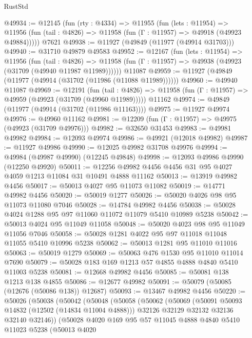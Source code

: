 \begin{lexlean}{RustStd}
\begin{coremodule}
@49934 := @12145
    (fun (rty : @4334) =>
    @11955
      (fun (lets : @11954) =>
      @11956 (fun (tail : @4826) => @11958 (fun (Γ : @11957) => @49918 (@49923 @49884)))))
    @7621
@49938 := @11927 (@49849 (@11977 (@49914 @31703)))
@49940 := @31710 @49879 @49583
@49952 := @12167
    (fun (lets : @11954) =>
    @11956
      (fun (tail : @4826) =>
      @11958 (fun (Γ : @11957) => @49938 (@49923 (@31709 (@49940 @11987 @11989))))))
    @11087
@49959 := @11927 (@49849 (@11977 (@49914 (@31702 (@11986 (@11088 @11989))))))
@49960 := @49940 @11087
@49969 := @12191
    (fun (tail : @4826) => @11958 (fun (Γ : @11957) => @49959 (@49923 (@31709 (@49960 @11989)))))
    @11162
@49974 := @49849 (@11977 (@49914 (@31702 (@11986 @11163))))
@49975 := @11927 @49974
@49976 := @49960 @11162
@49981 := @12209 (fun (Γ : @11957) => @49975 (@49923 (@31709 @49976)))
@49982 := @32650 @31453
@49983 := @49981 @49982
@49984 := @12093 @49974
@49986 := @49921 (@12018 @49982)
@49987 := @11927 @49986
@49990 := @12025 @49982 @31708 @49976
@49994 := @49984 (@49987 @49990) (@12245 @49848)
@49998 := @12093 @49986 @49990 (@12250 @49920)
@50011 := @12256 @49982 @4456 @4456 @31 @95 @4027 @4059 @1213 @11084 @31 @10491 @4888 @11162
@50013 := @13919 @49982 @4456
@50017 := @50013 @4027 @95 @11073 @11082
@50019 := @14771 @49982 @4456
@50020 := @50019 @1277
@50026 := @50020 @4026 @98 @95 @11073 @11080 @7046
@50028 := @14784 @49982 @4456
@50038 := @50028 @4024 @1288 @95 @97 @11060 @11072 @11079 @5410 @10989 @5238
@50042 := @50013 @4024 @95 @11049 @11058
@50048 := @50020 @4023 @98 @95 @11049 @11056 @7046
@50058 := @50028 @1281 @4022 @95 @97 @11018 @11048 @11055 @5410 @10996 @5238
@50062 := @50013 @1281 @95 @11010 @11016
@50063 := @50019 @1279
@50069 := @50063 @476 @1530 @95 @11010 @11014 @7690
@50079 := @50028 @183 @169 @1213 @57 @4855 @4888 @4840 @5410 @11003 @5238
@50081 := @12668 @49982 @4456
@50085 := @50081 @138 @1213 @138 @4855
@50086 := @12677 @49982
@50091 := @50079 (@50085 (@12676 (@50086 @138)) @12687)
@50093 := @13467 @49982 @4456
@50220 := @50026
    (@50038
      (@50042
        (@50048
          (@50058
            (@50062
              (@50069
                (@50091 @50093 @14832 (@12502 (@14834 @11004 @4888)))
                @32126
                @32129
                @32132
                @32136
                @32140
                @32146))
            (@50028
              @4020
              @169
              @95
              @57
              @11045
              @4888
              @4840
              @5410
              @11023
              @5238
              (@50013
                @4020

\end{coremodule}
\end{lexlean}
